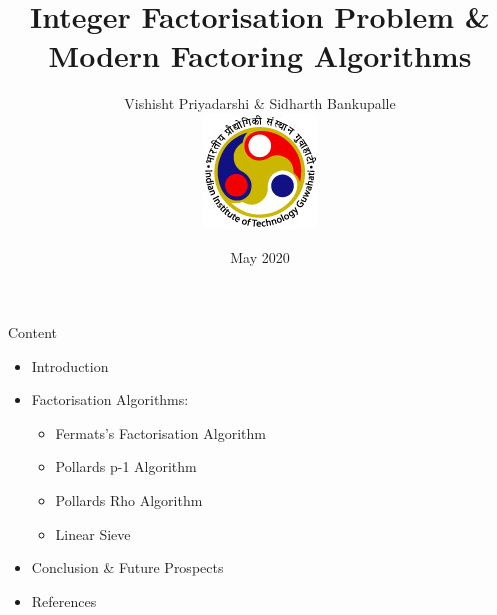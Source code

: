 \documentclass{beamer}
\title[Integer Factorisation]{Integer Factorisation Problem \& Modern Factoring Algorithms}
\author[VP and SB]{Vishisht Priyadarshi \& Sidharth Bankupalle\\[2ex] \includegraphics[scale=0.25]{iitg_logo.jpg}}
\institute[IITG]{Indian Institute of Technology Guwahati}
\date{May 2020}
\begin{document}
\maketitle
\begin{frame}{Content}
\begin{itemize}
    \item Introduction
    \item Factorisation Algorithms:
    \begin{itemize}
         \item Fermats's Factorisation Algorithm
         \item Pollards p-1 Algorithm
         \item Pollards Rho Algorithm
         \item Linear Sieve
    \end{itemize}
    \item Conclusion \& Future Prospects 
    \item References
\end{itemize}
\end{frame}
\end{document}
